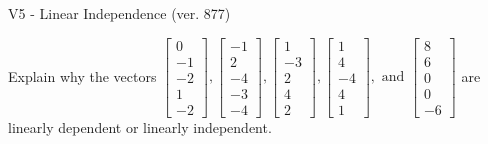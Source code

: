 \begin{exercise}
  \begin{exerciseTitle}V5 - Linear Independence (ver. 877)\end{exerciseTitle}
  \begin{exerciseStatement}
    Explain why the vectors \(\left[\begin{array}{r}
0 \\
-1 \\
-2 \\
1 \\
-2
\end{array}\right] , \left[\begin{array}{r}
-1 \\
2 \\
-4 \\
-3 \\
-4
\end{array}\right] , \left[\begin{array}{r}
1 \\
-3 \\
2 \\
4 \\
2
\end{array}\right] , \left[\begin{array}{r}
1 \\
4 \\
-4 \\
4 \\
1
\end{array}\right] , \text{ and } \left[\begin{array}{r}
8 \\
6 \\
0 \\
0 \\
-6
\end{array}\right]\) are linearly dependent or linearly independent.	



\end{exerciseStatement}
\end{exercise}
